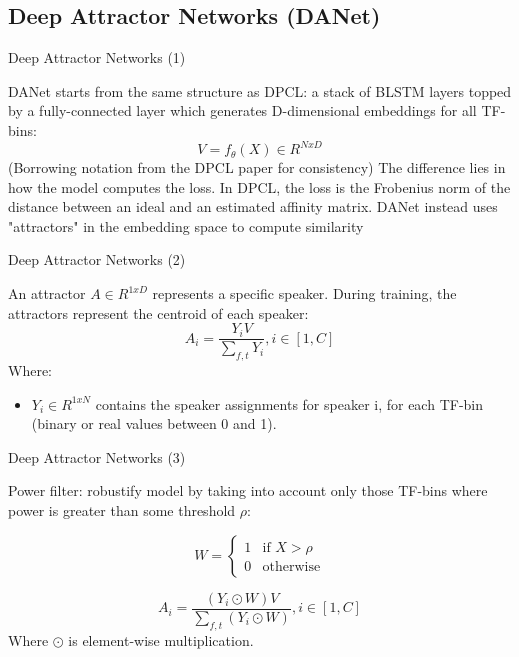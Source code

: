 \documentclass[11pt]{beamer}
\begin{document}
\subsection{Deep Attractor Networks (DANet)}
\begin{frame}{Deep Attractor Networks (1)}

DANet starts from the same structure as DPCL: a stack of BLSTM layers topped by a fully-connected layer which generates D-dimensional embeddings for all TF-bins:
\begin{equation}
V = f_{\theta}(X) \in R^{NxD}
\end{equation}
(Borrowing notation from the DPCL paper \cite{1607.02173} for consistency)
\linebreak
\linebreak
The difference lies in how the model computes the loss. In DPCL, the loss is the Frobenius norm of the distance between an ideal and an estimated affinity matrix. DANet instead uses "attractors" in the embedding space to compute similarity \cite{1707.03634}
\end{frame}

\begin{frame}{Deep Attractor Networks (2)}

An attractor $A \in R^{1xD}$ represents a specific speaker.
\linebreak
During training, the attractors represent the centroid of each speaker:
\begin{equation}
A_i = \frac {Y_iV}{\sum\limits_{f,t}{Y_i}}, i \in [1,C]
\end{equation}
Where:
\begin{itemize}
\item $Y_i \in R^{1xN}$ contains the speaker assignments for speaker i, for each TF-bin (binary or real values between 0 and 1).
\end{itemize}
\end{frame}

\begin{frame}{Deep Attractor Networks (3)}

Power filter: robustify model by taking into account only those TF-bins where power is greater than some threshold $\rho$:

\begin{equation}
  W =
  \begin{cases}
    1 & \text{if $X > \rho$} \\
    0 & \text{otherwise}
  \end{cases}
\end{equation}

\begin{equation}
A_i = \frac { (Y_i \odot W) V} { \sum\limits_{f,t}{(Y_i \odot W)} }, i\in [1,C]
\end{equation}
\linebreak
Where $\odot$ is element-wise multiplication.
\end{frame}
\end{document}
